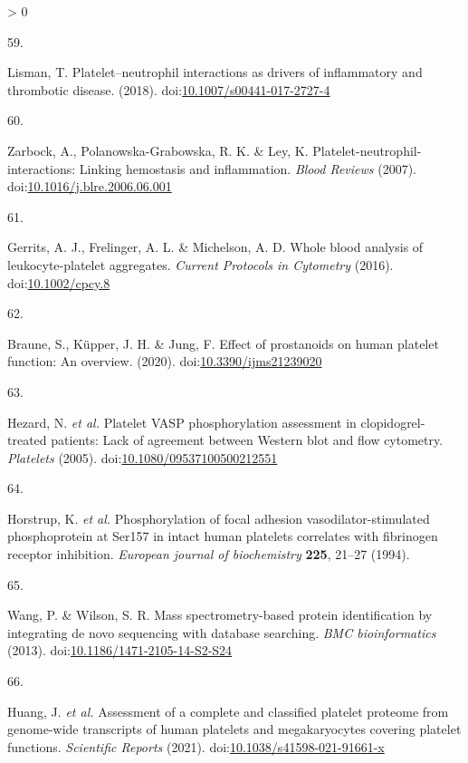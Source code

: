 \documentclass[11pt,twoside]{bristolthesis}
\newlength{\cslhangindent}
\newlength{\csllabelwidth}
\newenvironment{CSLReferences}[2] %
 {%
  \setlength{\parindent}{0pt}
  \ifodd #1 \everypar{\setlength{\hangindent}{\cslhangindent}}\ignorespaces\fi
  \ifnum #2 > 0
  \setlength{\parskip}{#2\baselineskip}
  \fi
 }%
 {}
\newcommand{\CSLLeftMargin}[1]{\parbox[t]{\csllabelwidth}{#1}}
\newcommand{\CSLRightInline}[1]{\parbox[t]{\linewidth - \csllabelwidth}{#1}\break}
\begin{document}
\begin{CSLReferences}{0}{0}
\leavevmode\hypertarget{ref-Lisman2018}{}%
\CSLLeftMargin{59. }
\CSLRightInline{Lisman, T. {Platelet--neutrophil interactions as drivers of inflammatory and thrombotic disease}. (2018). doi:\href{https://doi.org/10.1007/s00441-017-2727-4}{10.1007/s00441-017-2727-4}}

\leavevmode\hypertarget{ref-Zarbock2007}{}%
\CSLLeftMargin{60. }
\CSLRightInline{Zarbock, A., Polanowska-Grabowska, R. K. \& Ley, K. {Platelet-neutrophil-interactions: Linking hemostasis and inflammation}. \emph{Blood Reviews} (2007). doi:\href{https://doi.org/10.1016/j.blre.2006.06.001}{10.1016/j.blre.2006.06.001}}

\leavevmode\hypertarget{ref-Gerrits2016}{}%
\CSLLeftMargin{61. }
\CSLRightInline{Gerrits, A. J., Frelinger, A. L. \& Michelson, A. D. {Whole blood analysis of leukocyte-platelet aggregates}. \emph{Current Protocols in Cytometry} (2016). doi:\href{https://doi.org/10.1002/cpcy.8}{10.1002/cpcy.8}}

\leavevmode\hypertarget{ref-Braune2020}{}%
\CSLLeftMargin{62. }
\CSLRightInline{Braune, S., Küpper, J. H. \& Jung, F. {Effect of prostanoids on human platelet function: An overview}. (2020). doi:\href{https://doi.org/10.3390/ijms21239020}{10.3390/ijms21239020}}

\leavevmode\hypertarget{ref-Hezard2005}{}%
\CSLLeftMargin{63. }
\CSLRightInline{Hezard, N. \emph{et al.} {Platelet VASP phosphorylation assessment in clopidogrel-treated patients: Lack of agreement between Western blot and flow cytometry}. \emph{Platelets} (2005). doi:\href{https://doi.org/10.1080/09537100500212551}{10.1080/09537100500212551}}

\leavevmode\hypertarget{ref-Horstrup1994}{}%
\CSLLeftMargin{64. }
\CSLRightInline{Horstrup, K. \emph{et al.} {Phosphorylation of focal adhesion vasodilator-stimulated phosphoprotein at Ser157 in intact human platelets correlates with fibrinogen receptor inhibition.} \emph{European journal of biochemistry} \textbf{225}, 21--27 (1994).}

\leavevmode\hypertarget{ref-Wang2013}{}%
\CSLLeftMargin{65. }
\CSLRightInline{Wang, P. \& Wilson, S. R. {Mass spectrometry-based protein identification by integrating de novo sequencing with database searching.} \emph{BMC bioinformatics} (2013). doi:\href{https://doi.org/10.1186/1471-2105-14-S2-S24}{10.1186/1471-2105-14-S2-S24}}

\leavevmode\hypertarget{ref-Huang2021}{}%
\CSLLeftMargin{66. }
\CSLRightInline{Huang, J. \emph{et al.} {Assessment of a complete and classified platelet proteome from genome-wide transcripts of human platelets and megakaryocytes covering platelet functions}. \emph{Scientific Reports} (2021). doi:\href{https://doi.org/10.1038/s41598-021-91661-x}{10.1038/s41598-021-91661-x}}


\end{CSLReferences}
\end{document}
